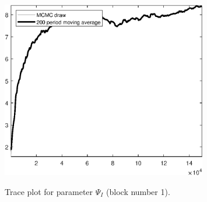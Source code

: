 \begin{figure}[H]
\centering
  \includegraphics[width=0.8\textwidth]{BRS_sectoral_wo_gmf/graphs/TracePlot_Psi_I_blck_1}\\
    \caption{Trace plot for parameter ${\Psi_I}$ (block number 1).}
\end{figure}
